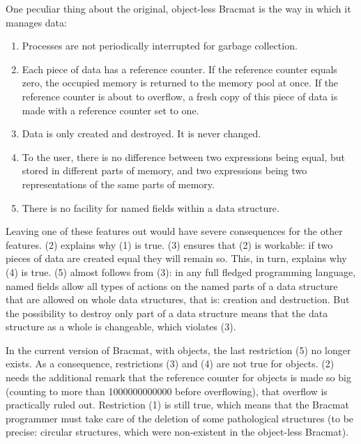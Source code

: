 \documentclass[12pt]{article}
\begin{document}
One peculiar thing about the original, object-less Bracmat is the way
in which it manages data:
\begin{enumerate}
\item Processes are not periodically interrupted for garbage
  collection.
\item Each piece of data has a reference counter. If the reference
  counter equals zero, the occupied memory is returned to the memory
  pool at once. If the reference counter is about to overflow, a fresh
  copy of this piece of data is made with a reference counter set to
  one.
\item Data is only created and destroyed. It is never changed.
\item To the user, there is no difference between two expressions
  being equal, but stored in different parts of memory, and two
  expressions being two representations of the same parts of memory.
\item There is no facility for named fields within a data structure.
\end{enumerate}

Leaving one of these features out would have severe consequences for
the other features. (2) explains why (1) is true. (3) ensures that (2)
is workable: if two pieces of data are created equal they will remain
so. This, in turn, explains why (4) is true. (5) almost follows from
(3): in any full fledged programming language, named fields allow all
types of actions on the named parts of a data structure that are
allowed on whole data structures, that is: creation and
destruction. But the possibility to destroy only part of a data
structure means that the data structure as a whole is changeable,
which violates (3).

In the current version of Bracmat, with objects, the last restriction
(5) no longer exists. As a consequence, restrictions (3) and (4) are
not true for objects. (2) needs the additional remark that the
reference counter for objects is made so big (counting to more than
1000000000000 before overflowing), that overflow is practically ruled
out. Restriction (1) is still true, which means that the Bracmat
programmer must take care of the deletion of some pathological
structures (to be precise: circular structures, which were
non-existent in the object-less Bracmat).
\end{document}
